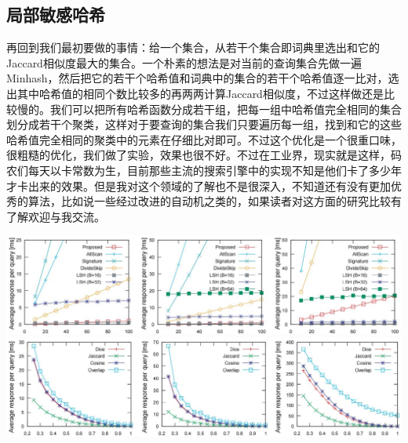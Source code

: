 \documentclass[a0,portrait,20pt]{a0poster}
\begin{document}
\begin{multicols}{2}
		\subsection*{局部敏感哈希}
		再回到我们最初要做的事情：给一个集合，从若干个集合即词典里选出和它的Jaccard相似度最大的集合。一个朴素的想法是对当前的查询集合先做一遍Minhash，然后把它的若干个哈希值和词典中的集合的若干个哈希值逐一比对，选出其中哈希值的相同个数比较多的再两两计算Jaccard相似度，不过这样做还是比较慢的。我们可以把所有哈希函数分成若干组，把每一组中哈希值完全相同的集合划分成若干个聚类，这样对于要查询的集合我们只要遍历每一组，找到和它的这些哈希值完全相同的聚类中的元素在仔细比对即可。不过这个优化是一个很重口味，很粗糙的优化，我们做了实验，效果也很不好。不过在工业界，现实就是这样，码农们每天以卡常数为生，目前那些主流的搜索引擎中的实现不知是他们卡了多少年才卡出来的效果。但是我对这个领域的了解也不是很深入，不知道还有没有更加优秀的算法，比如说一些经过改进的自动机之类的，如果读者对这方面的研究比较有了解欢迎与我交流。
		\begin{center}\vspace{1cm}
			\includegraphics[width=0.8\linewidth]{asd}
			\includegraphics[width=0.8\linewidth]{sdf}
		\end{center}\vspace{1cm}
	\end{multicols}
\end{document}
